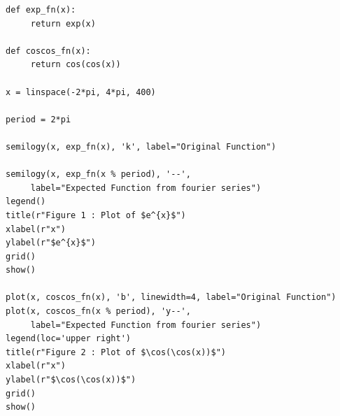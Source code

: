 \documentclass[11pt, a4paper]{article}
\begin{document}
     \begin{lstlisting}
def exp_fn(x):
     return exp(x)

def coscos_fn(x):
     return cos(cos(x))

x = linspace(-2*pi, 4*pi, 400)

period = 2*pi

semilogy(x, exp_fn(x), 'k', label="Original Function")

semilogy(x, exp_fn(x % period), '--',
     label="Expected Function from fourier series")
legend()
title(r"Figure 1 : Plot of $e^{x}$")
xlabel(r"x")
ylabel(r"$e^{x}$")
grid()
show()

plot(x, coscos_fn(x), 'b', linewidth=4, label="Original Function")
plot(x, coscos_fn(x % period), 'y--',
     label="Expected Function from fourier series")
legend(loc='upper right')
title(r"Figure 2 : Plot of $\cos(\cos(x))$")
xlabel(r"x")
ylabel(r"$\cos(\cos(x))$")
grid()
show()
     \end{lstlisting}
\end{document}
